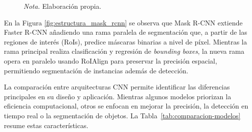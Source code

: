 \begin{figure}[h]
{%
    }

    \vspace{0.2cm}
    \caption*{\normalfont\normalsize\textit{Nota.} Elaboración propia.}
\end{figure}

\vspace{-0.5cm}
En la Figura \ref{fig:estructura_mask_rcnn} se observa que Mask R-CNN extiende Faster R-CNN añadiendo una rama paralela de segmentación que, a partir de las regiones de interés (RoIs), predice máscaras binarias a nivel de píxel. Mientras la rama principal realiza clasificación y regresión de \textit{bounding boxes}, la nueva rama opera en paralelo usando RoIAlign para preservar la precisión espacial, permitiendo segmentación de instancias además de detección.

La comparación entre arquitecturas CNN permite identificar las diferencias principales en su diseño y aplicación. Mientras algunos modelos priorizan la eficiencia computacional, otros se enfocan en mejorar la precisión, la detección en tiempo real o la segmentación de objetos. La Tabla~\ref{tab:comparacion-modelos} resume estas características. \\

\begingroup

\setlength{\tabcolsep}{4pt}
\renewcommand{\arraystretch}{1.08}
\scriptsize

